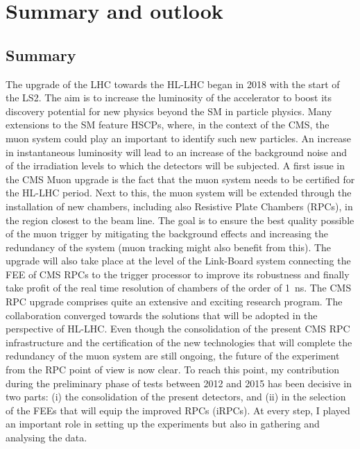 \renewcommand\evenpagerightmark{{\scshape\small Chapter 7}}
\renewcommand\oddpageleftmark{{\scshape\small Summary and outlook}}

\hyphenation{}

\chapter[Summary and outlooks]{Summary and outlook}
\label{chapt7}

	\section{Summary}
	\label{chapt7:sec:summary}
	
	The upgrade of the \acf{LHC} towards the \acf{HL-LHC} began in 2018 with the start of the \acf{LS2}. The aim is to increase the luminosity of the accelerator to boost its discovery potential for new physics beyond the \acf{SM} in particle physics. Many extensions to the SM feature \acf{HSCPs}, where, in the context of the \acf{CMS}, the muon system could play an important to identify such new particles. An increase in instantaneous luminosity will lead to an increase of the background noise and of the irradiation levels to which the detectors will be subjected. A first issue in the CMS Muon upgrade is the fact that the muon system needs to be certified for the HL-LHC period. Next to this, the muon system will be extended through the installation of new chambers, including also Resistive Plate Chambers (RPCs), in the region closest to the beam line. The goal is to ensure the best quality possible of the muon trigger by mitigating the background effects and increasing the redundancy of the system (muon tracking might also benefit from this). The upgrade will also take place at the level of the Link-Board system connecting the \acf{FEE} of CMS RPCs to the trigger processor to improve its robustness and finally take profit of the real time resolution of chambers of the order of \SI{1}{ns}. The CMS RPC upgrade comprises quite an extensive and exciting research program. The collaboration converged towards the solutions that will be adopted in the perspective of HL-LHC. Even though the consolidation of the present CMS RPC infrastructure and the certification of the new technologies that will complete the redundancy of the muon system are still ongoing, the future of the experiment from the RPC point of view is now clear. To reach this point, my contribution during the preliminary phase of tests between 2012 and 2015 has been decisive in two parts: (i) the consolidation of the present detectors, and (ii) in the selection of the FEEs that will equip the improved RPCs (iRPCs). At every step, I played an important role in setting up the experiments but also in gathering and analysing the data.
	
